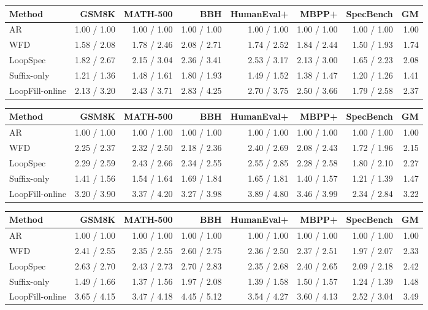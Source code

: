 \begin{tabular}{lrrrrrrr}
\hline
Method & GSM8K & MATH-500 & BBH & HumanEval+ & MBPP+ & SpecBench & GM \\
\hline
AR & 1.00 / 1.00 & 1.00 / 1.00 & 1.00 / 1.00 & 1.00 / 1.00 & 1.00 / 1.00 & 1.00 / 1.00 & 1.00 \\
WFD & 1.58 / 2.08 & 1.78 / 2.46 & 2.08 / 2.71 & 1.74 / 2.52 & 1.84 / 2.44 & 1.50 / 1.93 & 1.74 \\
LoopSpec & 1.82 / 2.67 & 2.15 / 3.04 & 2.36 / 3.41 & 2.53 / 3.17 & 2.13 / 3.00 & 1.65 / 2.23 & 2.08 \\
Suffix-only & 1.21 / 1.36 & 1.48 / 1.61 & 1.80 / 1.93 & 1.49 / 1.52 & 1.38 / 1.47 & 1.20 / 1.26 & 1.41 \\
LoopFill-online & 2.13 / 3.20 & 2.43 / 3.71 & 2.83 / 4.25 & 2.70 / 3.75 & 2.50 / 3.66 & 1.79 / 2.58 & 2.37 \\
\hline
\end{tabular}

\begin{tabular}{lrrrrrrr}
\hline
Method & GSM8K & MATH-500 & BBH & HumanEval+ & MBPP+ & SpecBench & GM \\
\hline
AR & 1.00 / 1.00 & 1.00 / 1.00 & 1.00 / 1.00 & 1.00 / 1.00 & 1.00 / 1.00 & 1.00 / 1.00 & 1.00 \\
WFD & 2.25 / 2.37 & 2.32 / 2.50 & 2.18 / 2.36 & 2.40 / 2.69 & 2.08 / 2.43 & 1.72 / 1.96 & 2.15 \\
LoopSpec & 2.29 / 2.59 & 2.43 / 2.66 & 2.34 / 2.55 & 2.55 / 2.85 & 2.28 / 2.58 & 1.80 / 2.10 & 2.27 \\
Suffix-only & 1.41 / 1.56 & 1.54 / 1.64 & 1.69 / 1.84 & 1.65 / 1.81 & 1.40 / 1.57 & 1.21 / 1.39 & 1.47 \\
LoopFill-online & 3.20 / 3.90 & 3.37 / 4.20 & 3.27 / 3.98 & 3.89 / 4.80 & 3.46 / 3.99 & 2.34 / 2.84 & 3.22 \\
\hline
\end{tabular}

\begin{tabular}{lrrrrrrr}
\hline
Method & GSM8K & MATH-500 & BBH & HumanEval+ & MBPP+ & SpecBench & GM \\
\hline
AR & 1.00 / 1.00 & 1.00 / 1.00 & 1.00 / 1.00 & 1.00 / 1.00 & 1.00 / 1.00 & 1.00 / 1.00 & 1.00 \\
WFD & 2.41 / 2.55 & 2.35 / 2.55 & 2.60 / 2.75 & 2.36 / 2.50 & 2.37 / 2.51 & 1.97 / 2.07 & 2.33 \\
LoopSpec & 2.63 / 2.70 & 2.43 / 2.73 & 2.70 / 2.83 & 2.35 / 2.68 & 2.40 / 2.65 & 2.09 / 2.18 & 2.42 \\
Suffix-only & 1.49 / 1.66 & 1.37 / 1.56 & 1.97 / 2.08 & 1.39 / 1.58 & 1.50 / 1.57 & 1.24 / 1.39 & 1.48 \\
LoopFill-online & 3.65 / 4.15 & 3.47 / 4.18 & 4.45 / 5.12 & 3.54 / 4.27 & 3.60 / 4.13 & 2.52 / 3.04 & 3.49 \\
\hline
\end{tabular}
